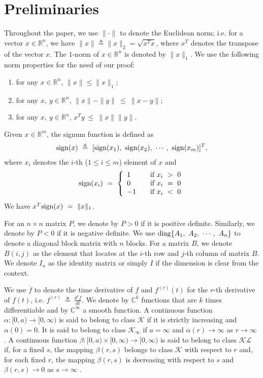 \documentclass[twoside,leqno,onecolumn]{article}
\begin{document}
\section{Preliminaries}
\label{sec:pre} Throughout the paper, we use $\|\cdot\|$ to denote
the Euclidean norm; i.e. for a vector $x\in\mathbb{R}^n$, we have
$\|x\| \triangleq\|x\|_2 =\sqrt{x^Tx}$, where $x^T$ denotes the
transpose of the vector $x$.  The $1$-norm of $x\in\mathbb{R}^n$
is denoted by $\|x\|_1$. We use the following norm properties for
the need of our proof:
\begin{enumerate}
\item for any $x\in\mathbb{R}^n$, $\|x\|\leq\|x\|_1$;
\item for any $x,~y\in\mathbb{R}^n$, $\|x\|-\|y\|~\leq~\|x-y\|$;
\item for any $x,~y\in\mathbb{R}^n$, $x^Ty~\leq~\|x\|\|y\|$.
\end{enumerate}
Given $x\in\mathbb{R}^m$, the signum function is defined as
\begin{align*}
{\rm{sign} } (x)~\triangleq~[{\rm{sign} } (x_1),~{\rm{sign} } (x_2),~\cdots,~{\rm{sign} } (x_m)]^T,
\end{align*}
where $x_i$ denotes the $i$-th ($1\leq i\leq m$) element of $x$ and
\[ {\rm{sign} } (x_i) ~=~ \left\{ \begin{array}{lll}
         1 & \quad\mbox{if $x_i ~>~ 0$}\\
         0 & \quad\mbox{if $x_i ~=~ 0$}\\
        -1 & \quad\mbox{if $x_i ~<~ 0$}\end{array} \right. \]
We have $x^T{\rm{sign} } (x)~=~\|x\|_1$.

For an $n\times n$
matrix $P$, we denote by $P>0$ if it is positive definite. Similarly, we denote
by $P<0$ if it is negative definite. We use ${\rm diag}\{A_1,~A_2,~\cdots,~A_n\}$ to denote a
diagonal block matrix with $n$ blocks. For a matrix $B$, we denote $B(i,j)$ as the element that locates at the $i$-th row and $j$-th column of matrix $B$. We denote $I_n$ as the identity matrix or simply $I$ if the dimension is clear from the context.

  We use $\dot{f}$ to denote the time derivative of $f$ and $f^{(r)}(t)$ for the $r$-th derivative of $f(t)$, i.e. $f^{(r)}~\triangleq~\frac{d^r f}{dt}$. We denote by $\mathbb{C}^k$ functions that are $k$ times differentiable and by $\mathbb{C}^\infty$ a smooth function. A continuous function $\alpha : [0,a)\rightarrow [0,\infty)$ is said to belong to class $\mathcal{K}$ if it is strictly increasing and $\alpha(0) = 0$. It is said to belong to class $\mathcal{K}_{\infty}$ if $a = \infty$ and $\alpha(r)\rightarrow \infty$ as $r\rightarrow \infty$ \cite{Khalil02}. A continuous function $\beta:[0,a)\times[0,\infty)\rightarrow [0,\infty)$ is said to belong to class $\mathcal{KL}$ if, for a fixed
$s$, the mapping $\beta(r,s)$ belongs to class $\mathcal{K}$ with respect to $r$ and, for each fixed $r$, the mapping $\beta(r,s)$ is decreasing with respect to $s$ and $\beta(r,s)\rightarrow 0$ as $s\rightarrow \infty$ \cite{Khalil02}.
\end{document}
